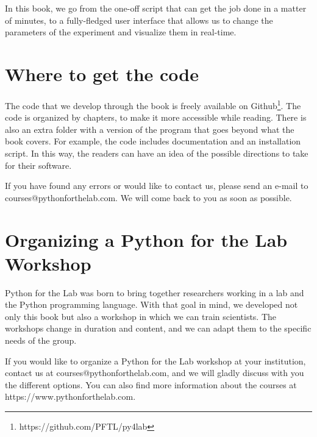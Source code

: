 In this book, we go from the one-off script that can get the job done in a matter of minutes, to a fully-fledged user interface that allows us to change the parameters of the experiment and visualize them in real-time.

\section{Where to get the code}\label{sec:where-to-get-the-code}
The code that we develop through the book is freely available on Github\footnote{https://github.com/PFTL/py4lab}. The code is organized by chapters, to make it more accessible while reading. There is also an extra folder with a version of the program that goes beyond what the book covers. For example, the code includes documentation and an installation script. In this way, the readers can have an idea of the possible directions to take for their software.

If you have found any errors or would like to contact us, please send an e-mail to courses@pythonforthelab.com. We will come back to you as soon as possible.

\section{Organizing a Python for the Lab Workshop}\label{sec:organizing-a-python-for-the-lab-workshop}
Python for the Lab was born to bring together researchers working in a lab and the Python programming language. With that goal in mind, we developed not only this book but also a workshop in which we can train scientists. The workshops change in duration and content, and we can adapt them to the specific needs of the group.

If you would like to organize a Python for the Lab workshop at your institution, contact us at courses@pythonforthelab.com, and we will gladly discuss with you the different options. You can also find more information about the courses at https://www.pythonforthelab.com.
